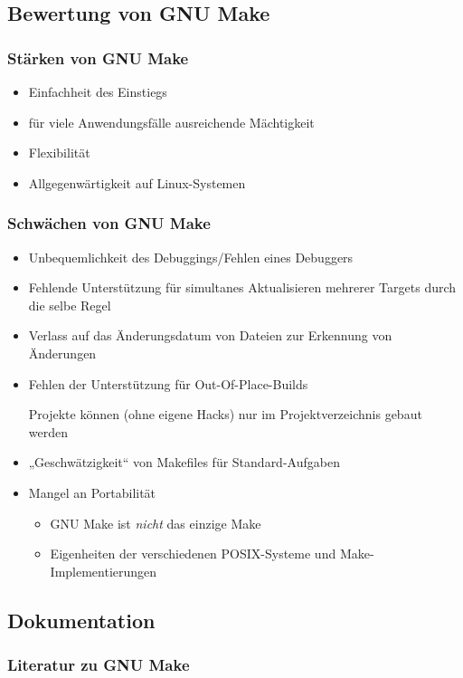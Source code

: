 \subsection{Bewertung von GNU Make}
\begin{frame}
	\frametitle{Stärken von GNU Make}
	\begin{itemize}
		\pause
		\item Einfachheit des Einstiegs
		\pause
		\item für viele Anwendungsfälle ausreichende Mächtigkeit
		\pause
		\item Flexibilität
		\pause
		\item Allgegenwärtigkeit auf Linux-Systemen
	\end{itemize}
\end{frame}

\begin{frame}
	\frametitle{Schwächen von GNU Make}
	\begin{itemize}
		\pause
		\item Unbequemlichkeit des Debuggings/Fehlen eines Debuggers
		\item Fehlende Unterstützung für simultanes Aktualisieren mehrerer Targets durch die selbe Regel
		\pause
		\item Verlass auf das Änderungsdatum von Dateien zur Erkennung von Änderungen
		\pause
		\item Fehlen der Unterstützung für Out-Of-Place-Builds

			Projekte können (ohne eigene Hacks) nur im Projektverzeichnis gebaut werden
		\pause
		\item „Geschwätzigkeit“ von Makefiles für Standard-Aufgaben
		\pause
		\item Mangel an Portabilität
			\begin{itemize}
				\pause
				\item GNU Make ist \emph{nicht} das einzige Make
				\pause
				\item Eigenheiten der verschiedenen POSIX-Systeme und Make-Implementierungen
			\end{itemize}
	\end{itemize}
\end{frame}

\subsection{Dokumentation}
\begin{frame}
	\frametitle{Literatur zu GNU Make}
\end{frame}
